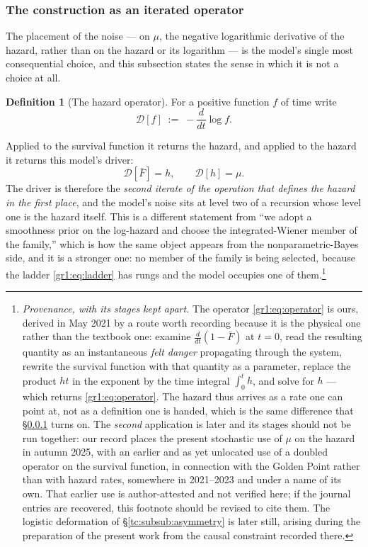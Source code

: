 \documentclass[11pt]{article}
\numberwithin{equation}{section}
\theoremstyle{plain}
\theoremstyle{definition}
\newtheorem{definition}[theorem]{Definition}
\theoremstyle{remark}
\begin{document}
\subsubsection{The construction as an iterated operator}
\label{gr1:subsub:operator}

The placement of the noise --- on $\mu$, the negative logarithmic
derivative of the hazard, rather than on the hazard or its logarithm ---
is the model's single most consequential choice, and this subsection
states the sense in which it is not a choice at all.

\begin{definition}[The hazard operator]\label{gr1:def:operator}
For a positive function $f$ of time write
\begin{equation}\label{gr1:eq:operator}
\mathcal D[f]\;:=\;-\frac{d}{dt}\log f .
\end{equation}
\end{definition}

\noindent Applied to the survival function it returns the hazard, and
applied to the hazard it returns this model's driver:
\begin{equation}\label{gr1:eq:ladder}
\mathcal D[\bar F]=h,\qquad \mathcal D[h]=\mu .
\end{equation}
The driver is therefore the \emph{second iterate of the operation that
defines the hazard in the first place}, and the model's noise sits at
level two of a recursion whose level one is the hazard itself. This is a
different statement from ``we adopt a smoothness prior on the log-hazard
and choose the integrated-Wiener member of the family,'' which is how
the same object appears from the nonparametric-Bayes side, and it is a
stronger one: no member of the family is being selected, because the
ladder \eqref{gr1:eq:ladder} has rungs and the model occupies one of
them.\footnote{%
\emph{Provenance, with its stages kept apart.} The operator
\eqref{gr1:eq:operator} is ours, derived in May 2021 by a route
worth recording because it is the physical one rather than the textbook
one: examine $\frac{d}{dt}(1-\bar F)$ at $t=0$, read the resulting
quantity as an instantaneous \emph{felt danger} propagating through the
system, rewrite the survival function with that quantity as a parameter,
replace the product $ht$ in the exponent by the time integral
$\int_0^t h$, and solve for $h$ --- which returns
\eqref{gr1:eq:operator}. The hazard thus arrives as a rate one can point
at, not as a definition one is handed, which is the same difference that
\S\ref{gr1:subsub:operator} turns on. The \emph{second} application is
later and its stages should not be run together: our record
places the present stochastic use of $\mu$ on the hazard in autumn 2025,
with an earlier and as yet unlocated use of a doubled operator on the
survival function, in connection with the Golden Point rather than with
hazard rates, somewhere in 2021--2023 and under a name of its own. That
earlier use is author-attested and not verified here; if the journal
entries are recovered, this footnote should be revised to cite them.
The logistic deformation of \S\ref{tc:subsub:asymmetry} is later still,
arising during the preparation of the present work from the causal
constraint recorded there.}
\end{document}
